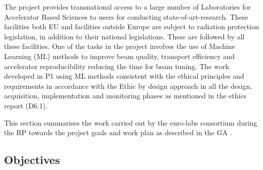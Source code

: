 The project provides transnational access to a large number of Laboratories for Accelerator Based Sciences to users for conducting state-of-art-research.  These facilities both EU and facilities outside Europe are subject to radiation protection legislation, in addition to their national legislations. These are followed by all these facilities.  One of the tasks in the project involves the use of Machine Learning (ML) methods to improve beam quality, transport efficiency and accelerator reproducibility reducing the time for beam tuning. The work developed in P1 using ML methods consistent with the ethical principles and requirements in accordance with the Ethic by design approach in all the design, acquisition, implementation and monitoring phases as mentioned in the ethics report (D6.1).


This section summarises the work carried out by the \acrshort{euro-labs} consortium during the  \acrshort{RP} towards the project goals and work plan as described in the \acrfull{GA} \cite{bib:grantagreement2020}. 

\subsection{Objectives}

